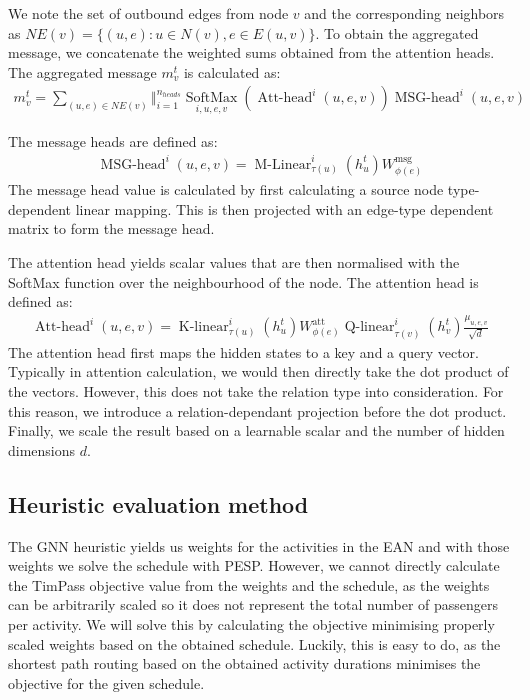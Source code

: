 \documentclass[english, 12pt, a4paper, sci, utf8, a-2b, online]{aaltothesis}
\begin{document}
We note the set of outbound edges from node $v$ and the corresponding neighbors as $NE(v) = \{(u, e) : u \in N(v), e \in E(u, v)\}$. To obtain the aggregated message, we concatenate the weighted sums obtained from the attention heads. The aggregated message $m_v^t$ is calculated as:
\begin{align*}
    m_v^t = \sum_{(u, e) \in \mathit{NE}(v)} \operatorname{\Big\Vert}_{i = 1}^{n_{\mathit{heads}}} \underset{i, u, e, v}{\operatorname{SoftMax}}(\operatorname{Att-head}^i(u, e, v))\operatorname{MSG-head}^i(u, e, v)
\end{align*}  %

The message heads are defined as:
\begin{align*}
    \operatorname{MSG-head}^i(u, e, v) = \operatorname{M-Linear}^i_{\tau(u)}(h^{t}_u)W^{\text{msg}}_{\phi(e)}
\end{align*}
The message head value is calculated by first calculating a source node type-dependent linear mapping. This is then projected with an edge-type dependent matrix to form the message head.

The attention head yields scalar values that are then normalised with the SoftMax function over the neighbourhood of the node. The attention head is defined as:
\begin{align*}
    \operatorname{Att-head}^i(u, e, v) = \operatorname{K-linear}^i_{\tau(u)}(h^t_u)W^\text{att}_{\phi(e)}\operatorname{Q-linear}^i_{\tau(v)}(h^t_v)\frac{\mu_{u, e, v}}{\sqrt{d}}
\end{align*}
The attention head first maps the hidden states to a key and a query vector. Typically in attention calculation, we would then directly take the dot product of the vectors. However, this does not take the relation type into consideration. For this reason, we introduce a relation-dependant projection before the dot product. Finally, we scale the result based on a learnable scalar and the number of hidden dimensions $d$.


\subsection{Heuristic evaluation method}
\label{sec:heur-eval}


The GNN heuristic yields us weights for the activities in the EAN and with those weights we solve the schedule with PESP. However, we cannot directly calculate the TimPass objective value from the weights and the schedule, as the weights can be arbitrarily scaled so it does not represent the total number of passengers per activity. We will solve this by calculating the objective minimising properly scaled weights based on the obtained schedule. Luckily, this is easy to do, as the shortest path routing based on the obtained activity durations minimises the objective for the given schedule.
\end{document}
